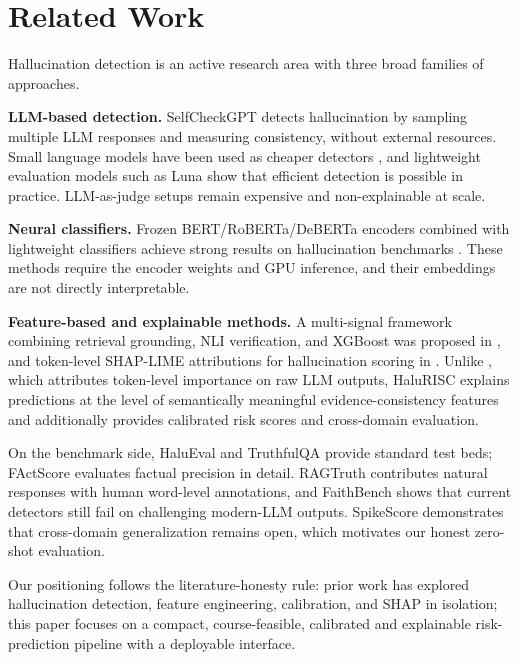 \section{Related Work}

Hallucination detection is an active research area with three broad families of approaches.

\textbf{LLM-based detection.} SelfCheckGPT \cite{selfcheck} detects hallucination by sampling multiple LLM responses and measuring consistency, without external resources. Small language models have been used as cheaper detectors \cite{haluagent}, and lightweight evaluation models such as Luna \cite{luna} show that efficient detection is possible in practice. LLM-as-judge setups remain expensive and non-explainable at scale.

\textbf{Neural classifiers.} Frozen BERT/RoBERTa/DeBERTa encoders combined with lightweight classifiers achieve strong results on hallucination benchmarks \cite{ieeeTai}. These methods require the encoder weights and GPU inference, and their embeddings are not directly interpretable.

\textbf{Feature-based and explainable methods.} A multi-signal framework combining retrieval grounding, NLI verification, and XGBoost was proposed in \cite{ijert}, and token-level SHAP-LIME attributions for hallucination scoring in \cite{multimedia}. Unlike \cite{multimedia}, which attributes token-level importance on raw LLM outputs, HaluRISC explains predictions at the level of semantically meaningful evidence-consistency features and additionally provides calibrated risk scores and cross-domain evaluation.

On the benchmark side, HaluEval \cite{haluEval} and TruthfulQA \cite{truthqa} provide standard test beds; FActScore \cite{factscore} evaluates factual precision in detail. RAGTruth \cite{ragtruth} contributes natural responses with human word-level annotations, and FaithBench \cite{faithbench} shows that current detectors still fail on challenging modern-LLM outputs. SpikeScore \cite{spikescore} demonstrates that cross-domain generalization remains open, which motivates our honest zero-shot evaluation.

Our positioning follows the literature-honesty rule: prior work has explored hallucination detection, feature engineering, calibration, and SHAP in isolation; this paper focuses on a compact, course-feasible, calibrated and explainable risk-prediction pipeline with a deployable interface.
